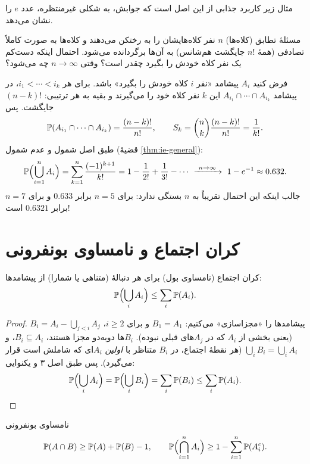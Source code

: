 مثال زیر کاربرد جذابی از این اصل است که جوابش، به شکلی غیرمنتظره، عدد $e$ را نشان می‌دهد.

\begin{example}[label=ex:matching]{مسئلهٔ تطابق (کلاه‌ها)}
$n$ نفر کلاه‌هایشان را به رختکن می‌دهند و کلاه‌ها به صورت کاملاً تصادفی (همهٔ $n!$ جایگشت هم‌شانس) به آن‌ها برگردانده می‌شود. احتمال اینکه دست‌کم یک نفر کلاه خودش را بگیرد چقدر است؟ وقتی $n\to\infty$ چه می‌شود؟
\begin{solution}
فرض کنید $A_i$ پیشامد «نفر $i$ کلاه خودش را بگیرد» باشد. برای هر $i_1<\cdots<i_k$، در پیشامد $A_{i_1}\cap\cdots\cap A_{i_k}$ این $k$ نفر کلاه خود را می‌گیرند و بقیه به هر ترتیبی: $(n-k)!$ جایگشت. پس
\[ \P(A_{i_1}\cap\cdots\cap A_{i_k})=\frac{(n-k)!}{n!},\qquad S_k=\binom nk\frac{(n-k)!}{n!}=\frac1{k!}. \]
طبق اصل شمول و عدم شمول (قضیهٔ \ref{thm:ie-general}):
\[ \P\Bigl(\bigcup_{i=1}^nA_i\Bigr)=\sum_{k=1}^n\frac{(-1)^{k+1}}{k!}=1-\frac1{2!}+\frac1{3!}-\cdots\ \xrightarrow{\ n\to\infty\ }\ 1-e^{-1}\approx0.632. \]
جالب اینکه این احتمال تقریباً به $n$ بستگی ندارد: برای $n=5$ برابر $0.633$ و برای $n=7$ برابر $0.6321$ است!
\end{solution}
\end{example}

\section{کران اجتماع و نامساوی بونفرونی}


\begin{theorem}[label=thm:union-bound]{کران اجتماع (نامساوی بول)}
برای هر دنبالهٔ (متناهی یا شمارا) از پیشامدها:
\[ \P\Bigl(\bigcup_{i}A_i\Bigr)\le\sum_{i}\P(A_i). \]
\end{theorem}

\begin{proof}
پیشامدها را «مجزاسازی» می‌کنیم: $B_1=A_1$ و برای $i\ge2$، $B_i=A_i-\bigcup_{j<i}A_j$ (یعنی بخشی از $A_i$ که در $A_j$های قبلی نبوده). $B_i$ها دوبه‌دو مجزا هستند، $B_i\subseteq A_i$، و $\bigcup_iB_i=\bigcup_iA_i$ (هر نقطهٔ اجتماع، در $B_i$ متناظر با \emph{اولین} $A_i$ای که شاملش است قرار می‌گیرد). پس طبق اصل ۳ و یکنوایی:
\[ \P\Bigl(\bigcup_iA_i\Bigr)=\P\Bigl(\bigcup_iB_i\Bigr)=\sum_i\P(B_i)\le\sum_i\P(A_i). \]
\end{proof}

\begin{corollary}[label=cor:bonferroni]{نامساوی بونفرونی}
\[ \P(A\cap B)\ge\P(A)+\P(B)-1,\qquad \P\Bigl(\bigcap_{i=1}^nA_i\Bigr)\ge1-\sum_{i=1}^n\P(A_i^c). \]
\end{corollary}

